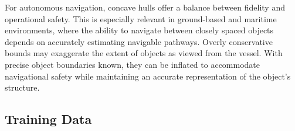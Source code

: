 \documentclass[../main.tex]{subfiles}
\begin{document}
For autonomous navigation, concave hulls offer a balance between fidelity and operational safety.
This is especially relevant in ground-based and maritime environments, where the ability to navigate between closely spaced objects depends on accurately estimating navigable pathways.
Overly conservative bounds may exaggerate the extent of objects as viewed from the vessel.
With precise object boundaries known, they can be inflated to accommodate navigational safety while maintaining an accurate representation of the object's structure.




\subsection{Training Data} \label{training_data_gbcache}
% 










\end{document}
